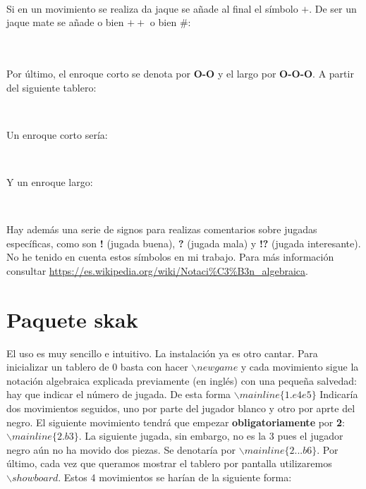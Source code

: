 \documentclass{article}
\begin{document}
 \\
\showboard

Si en un movimiento se realiza da jaque se añade al final el símbolo $+$. De ser un jaque mate se añade o bien $++$ o bien $\#$:

 \\
\showboard \\

Por último, el enroque corto se denota por \textbf{O-O} y el largo por \textbf{O-O-O}. A partir del siguiente tablero:

\newgame
{} \\
\showboard

Un enroque corto sería:

 \\
\showboard

Y un enroque largo:

 \\
\showboard

Hay además una serie de signos para realizas comentarios sobre jugadas específicas, como son \textbf{!} (jugada buena), \textbf{?} (jugada mala) y \textbf{!?} (jugada interesante). No he tenido en cuenta estos símbolos en mi trabajo. Para más información consultar \url{https://es.wikipedia.org/wiki/Notaci%C3%B3n_algebraica}.

\section{Paquete skak}

El uso es muy sencillo e intuitivo. La instalación ya es otro cantar. Para inicializar un tablero de 0 basta con hacer $\backslash newgame$ y cada movimiento sigue la notación algebraica explicada previamente (en inglés) con una pequeña salvedad: hay que indicar el número de jugada. De esta forma $\backslash mainline\{1.e4 e5\}$ Indicaría dos movimientos seguidos, uno por parte del jugador blanco y otro por aprte del negro. El siguiente movimiento tendrá que empezar \textbf{obligatoriamente} por \textbf{2}: $\backslash mainline\{2.b3\}$. La siguiente jugada, sin embargo, no es la 3 pues el jugador negro aún no ha movido dos piezas. Se denotaría por $\backslash mainline\{2...b6\}$. Por último, cada vez que queramos mostrar el tablero por pantalla utilizaremos $\backslash showboard$. Estos 4 movimientos se harían de la siguiente forma:

\newgame
{} \\
\showboard
\end{document}
